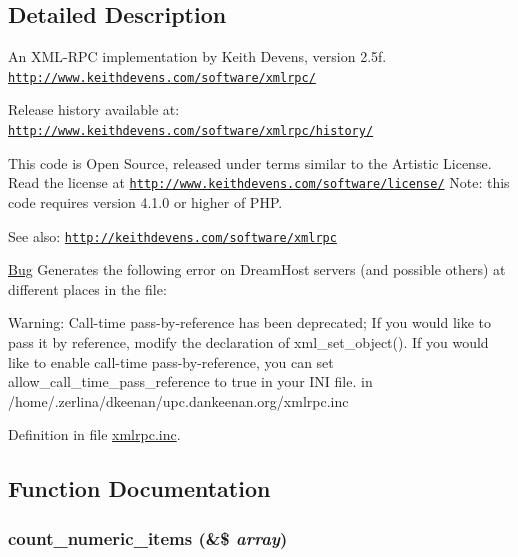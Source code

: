 \subsection{Detailed Description}
An XML-RPC implementation by Keith Devens, version 2.5f. \href{http://www.keithdevens.com/software/xmlrpc/}{\tt http://www.keithdevens.com/software/xmlrpc/}

Release history available at: \href{http://www.keithdevens.com/software/xmlrpc/history/}{\tt http://www.keithdevens.com/software/xmlrpc/history/}

This code is Open Source, released under terms similar to the Artistic License. Read the license at \href{http://www.keithdevens.com/software/license/}{\tt http://www.keithdevens.com/software/license/} Note: this code requires version 4.1.0 or higher of PHP.

\begin{Desc}
\item[See also:]\href{http://keithdevens.com/software/xmlrpc}{\tt http://keithdevens.com/software/xmlrpc}\end{Desc}
\begin{Desc}
\item[\hyperlink{bug__bug000001}{Bug}]Generates the following error on DreamHost servers (and possible others) at different places in the file:\par
 Warning: Call-time pass-by-reference has been deprecated; If you would like to pass it by reference, modify the declaration of xml\_\-set\_\-object(). If you would like to enable call-time pass-by-reference, you can set allow\_\-call\_\-time\_\-pass\_\-reference to true in your INI file. in /home/.zerlina/dkeenan/upc.dankeenan.org/xmlrpc.inc \end{Desc}


Definition in file \hyperlink{xmlrpc_8inc-source}{xmlrpc.inc}.

\subsection{Function Documentation}
\hypertarget{xmlrpc_8inc_88839ba2c5c835c99f55578c65faa401}{
\subsubsection{\setlength{\rightskip}{0pt plus 5cm}count\_\-numeric\_\-items (\&\$ {\em array})}}
\label{xmlrpc_8inc_88839ba2c5c835c99f55578c65faa401}




